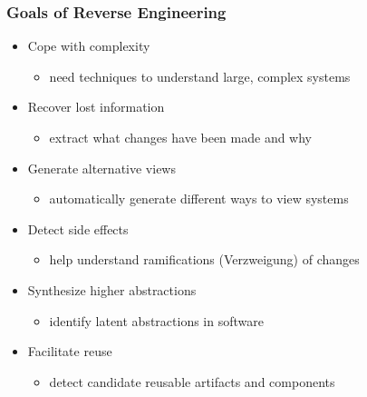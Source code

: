 \hypertarget{goals-of-reverse-engineering}{%
\subsubsection{Goals of Reverse
Engineering}\label{goals-of-reverse-engineering}}

\begin{itemize}
\tightlist
\item
  Cope with complexity

  \begin{itemize}
  \tightlist
  \item
    need techniques to understand large, complex systems
  \end{itemize}
\item
  Recover lost information

  \begin{itemize}
  \tightlist
  \item
    extract what changes have been made and why
  \end{itemize}
\item
  Generate alternative views

  \begin{itemize}
  \tightlist
  \item
    automatically generate different ways to view systems
  \end{itemize}
\item
  Detect side effects

  \begin{itemize}
  \tightlist
  \item
    help understand ramifications (Verzweigung) of changes
  \end{itemize}
\item
  Synthesize higher abstractions

  \begin{itemize}
  \tightlist
  \item
    identify latent abstractions in software
  \end{itemize}
\item
  Facilitate reuse

  \begin{itemize}
  \tightlist
  \item
    detect candidate reusable artifacts and components
  \end{itemize}
\end{itemize}


